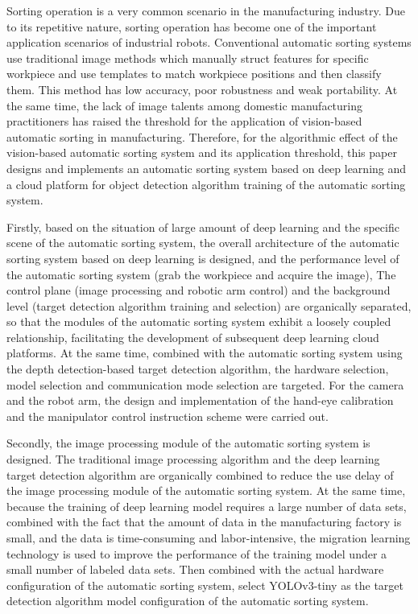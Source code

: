 \begin{englishabstract}
Sorting operation is a very common scenario in the manufacturing industry. Due to its repetitive nature, sorting operation
has become one of the important application scenarios of industrial robots. Conventional automatic sorting systems use traditional
image methods which manually struct features for specific workpiece and use templates to match workpiece positions and then classify them.
This method has low accuracy, poor robustness and weak portability. At the same time, the lack of image talents among domestic manufacturing practitioners has
raised the threshold for the application of vision-based automatic sorting in manufacturing. Therefore, for the algorithmic effect of the 
vision-based automatic sorting system and its application threshold, this paper designs and implements an automatic sorting system based on 
deep learning and a cloud platform for object detection algorithm training of the automatic sorting system.

Firstly, based on the situation of large amount of deep learning and the specific scene of the automatic sorting system, the overall architecture
of the automatic sorting system based on deep learning is designed, and the performance level of the automatic sorting system (grab the workpiece and 
acquire the image), The control plane (image processing and robotic arm control) and the background level (target detection algorithm training and selection) 
are organically separated, so that the modules of the automatic sorting system exhibit a loosely coupled relationship, 
facilitating the development of subsequent deep learning cloud platforms. At the same time, combined with the automatic sorting system using the depth detection-based
 target detection algorithm, the hardware selection, model selection and communication mode selection are targeted. 
 For the camera and the robot arm, the design and implementation of the hand-eye calibration and the manipulator control instruction scheme were carried out.

Secondly, the image processing module of the automatic sorting system is designed. 
The traditional image processing algorithm and the deep learning target detection algorithm are organically combined to reduce the 
use delay of the image processing module of the automatic sorting system. 
At the same time, because the training of deep learning model requires a large number of data sets, 
combined with the fact that the amount of data in the manufacturing factory is small, and the data is time-consuming and labor-intensive, 
the migration learning technology is used to improve the performance of the training model under a small number of labeled data sets. 
Then combined with the actual hardware configuration of the automatic sorting system, 
select YOLOv3-tiny as the target detection algorithm model configuration of the automatic sorting system.


\end{englishabstract}
